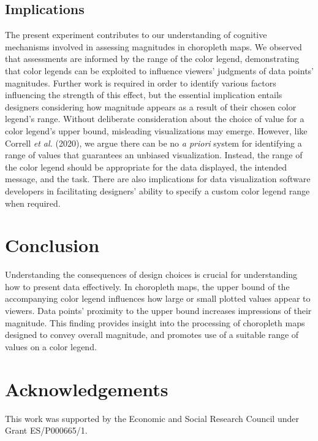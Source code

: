 \documentclass[
]{interact}
\begin{document}
\hypertarget{implications}{%
\subsection{Implications}\label{implications}}

The present experiment contributes to our understanding of cognitive
mechanisms involved in assessing magnitudes in choropleth maps. We
observed that assessments are informed by the range of the color legend,
demonstrating that color legends can be exploited to influence viewers'
judgments of data points' magnitudes. Further work is required in order
to identify various factors influencing the strength of this effect, but
the essential implication entails designers considering how magnitude
appears as a result of their chosen color legend's range. Without
deliberate consideration about the choice of value for a color legend's
upper bound, misleading visualizations may emerge. However, like Correll
\emph{et al.} (2020), we argue there can be no \emph{a priori} system
for identifying a range of values that guarantees an unbiased
visualization. Instead, the range of the color legend should be
appropriate for the data displayed, the intended message, and the task.
There are also implications for data visualization software developers
in facilitating designers' ability to specify a custom color legend
range when required.

\hypertarget{conclusion}{%
\section{Conclusion}\label{conclusion}}

Understanding the consequences of design choices is crucial for
understanding how to present data effectively. In choropleth maps, the
upper bound of the accompanying color legend influences how large or
small plotted values appear to viewers. Data points' proximity to the
upper bound increases impressions of their magnitude. This finding
provides insight into the processing of choropleth maps designed to
convey overall magnitude, and promotes use of a suitable range of values
on a color legend.

\hypertarget{acknowledgements}{%
\section*{Acknowledgements}\label{acknowledgements}}

This work was supported by the Economic and Social Research Council
under Grant ES/P000665/1.
\end{document}
